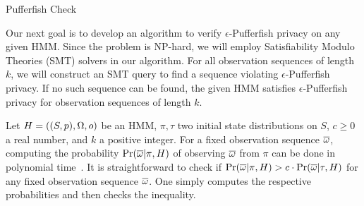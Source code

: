
\begin{algorithm}
  \begin{algorithmic}[1]
       \EndFor
         \EndFor
       \EndFor
     \EndFunction
 \end{algorithmic}
 \caption{Pufferfish Check}
 \label{algorithm:pufferfish-check}
\end{algorithm}

Our next goal is to develop an algorithm to verify
$\epsilon$-Pufferfish privacy on any given HMM. Since the problem is
NP-hard, we will employ Satisfiability Modulo Theories (SMT) solvers
in our algorithm. For all observation sequences of length $k$, we will
construct an SMT query to find a sequence violating
$\epsilon$-Pufferfish privacy. If no such sequence can be found, the
given HMM satisfies $\epsilon$-Pufferfish privacy for observation
sequences of length $k$.

Let $H = ((S, p), \Omega, o)$ be an HMM, $\pi, \tau$ two initial state
distributions on $S$, $c \geq 0$ a real number, and $k$ a positive
integer. For a fixed observation sequence $\overline{\omega}$,
computing the probability $\Pr (\overline{\omega} | \pi,
H)$ of observing $\overline{\omega}$ from $\pi$ can be done in
polynomial time~\cite{R:89:ATHMM}. It is straightforward to check if
$\Pr (\overline{\omega} | \pi, H) > c \cdot \Pr (\overline{\omega} |
\tau, H)$ for any fixed observation sequence $\overline{\omega}$. One
simply computes the respective probabilities and then checks the
inequality.

